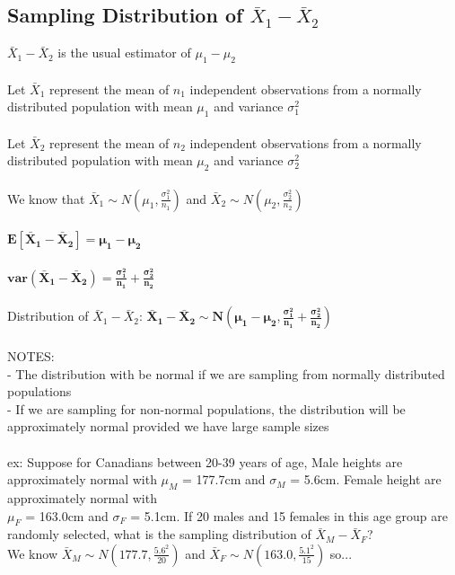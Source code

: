 \documentclass[12pt, a4paper]{article}
\begin{document}
	\subsection{Sampling Distribution of $\bar{X}_1 - \bar{X}_2$}
	$\bar{X}_1 - \bar{X}_2$ is the usual estimator of $\mu_1 - \mu_2$ \\~\\
	Let $\bar{X}_1$ represent the mean of $n_1$ independent observations from a normally distributed population with mean $\mu_1$ and variance $\sigma_1^2$ \\~\\
	Let $\bar{X}_2$ represent the mean of $n_2$ independent observations from a normally distributed population with mean $\mu_2$ and variance $\sigma_2^2$ \\~\\
	We know that $\bar{X}_1 \sim N(\mu_1, \frac{\sigma_1^2}{n_1})$ and $\bar{X}_2 \sim N(\mu_2, \frac{\sigma_2^2}{n_2})$ \\~\\
	$\bm{E[\bar{X}_1 - \bar{X}_2] = \mu_1 - \mu_2}$ \\~\\
	$\bm{var(\bar{X}_1 - \bar{X}_2) = \frac{\sigma_1^2}{n_1}+\frac{\sigma_2^2}{n_2}}$ \\~\\
	Distribution of $\bar{X}_1 - \bar{X}_2$: $\bm{\bar{X}_1 - \bar{X}_2 \sim N(\mu_1 - \mu_2, \frac{\sigma_1^2}{n_1}+\frac{\sigma_2^2}{n_2})}$ \\~\\
	NOTES: \\
	- The distribution with be normal if we are sampling from normally distributed populations \\
	- If we are sampling for non-normal populations, the distribution will be approximately normal \hspace*{1.5mm} provided we have large sample sizes \\~\\
	ex: Suppose for Canadians between 20-39 years of age, Male heights are approximately normal with $\mu_M$ = 177.7cm and $\sigma_M$ = 5.6cm. Female height are approximately normal with \\ $\mu_F$ = 163.0cm and $\sigma_F$ = 5.1cm. If 20 males and 15 females in this age group are randomly selected, what is the sampling distribution of $\bar{X}_M - \bar{X}_F$? \\
	We know $\bar{X}_M \sim N(177.7,\frac{5.6^2}{20})$ and $\bar{X}_F \sim N(163.0,\frac{5.1^2}{15})$ so... \\
\end{document}
